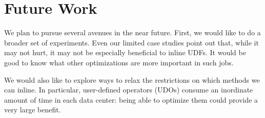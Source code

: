 \section{Future Work \label{sec:future}}

We plan to pursue several avenues in the near future.
First, we would like to do a broader set of experiments.
Even our limited case studies point out that, while it may not hurt, it may not be especially beneficial to inline UDFs.
It would be good to know what other optimizations are more important in such jobs.

We would also like to explore ways to relax the restrictions on which methods we can inline.
In particular, user-defined operators (UDOs) consume an inordinate amount of time in each data center: being able to optimize them could provide a very large benefit.
